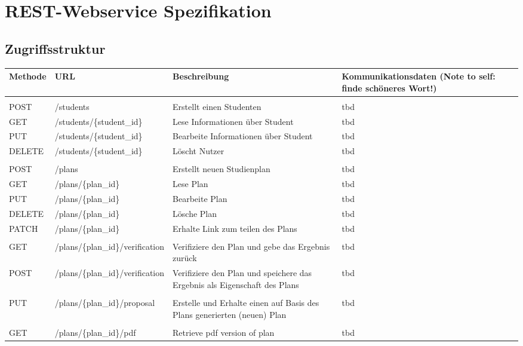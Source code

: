 \section{REST-Webservice Spezifikation}

\subsection{Zugriffsstruktur}

\begin{tabularx}{\textwidth}{@{} | X | X | X | X | @{}}
	\hline
	\textbf{Methode} & \textbf{URL} & \textbf{Beschreibung} & \textbf{Kommunikationsdaten (Note to self: finde schöneres Wort!)} \\ \hline  \hline
	& & & \\ \hline
	POST & /students & Erstellt einen Studenten & tbd
	\\ \hline
	GET & /students/\{student\_id\} & Lese Informationen über Student & tbd
	\\ \hline
	PUT & /students/\{student\_id\} & Bearbeite Informationen über Student & tbd
	\\ \hline
	DELETE & /students/\{student\_id\} & Löscht Nutzer & tbd \\ \hline
	& & & \\ \hline
	POST & /plans & Erstellt neuen Studienplan & tbd \\ \hline
	GET & /plans/\{plan\_id\} & Lese Plan & tbd \\ \hline
	PUT & /plans/\{plan\_id\} & Bearbeite Plan & tbd \\ \hline
	DELETE & /plans/\{plan\_id\} & Lösche Plan & tbd \\ \hline
	PATCH & /plans/\{plan\_id\} & Erhalte Link zum teilen des Plans & tbd \\ \hline
	& & & \\ \hline
	GET & /plans/\{plan\_id\}/verification & Verifiziere den Plan und gebe das Ergebnis zurück & tbd \\ \hline
	POST & /plans/\{plan\_id\}/verification & Verifiziere den Plan und speichere das Ergebnis als Eigenschaft des Plans & tbd \\ \hline
	& & & \\ \hline
	PUT & /plans/\{plan\_id\}/proposal & Erstelle und Erhalte einen auf Basis des Plans generierten (neuen) Plan & tbd \\ \hline
	& & & \\ \hline
	GET & /plans/\{plan\_id\}/pdf & Retrieve pdf version of plan & tbd \\ \hline
	\hline
\end{tabularx}


